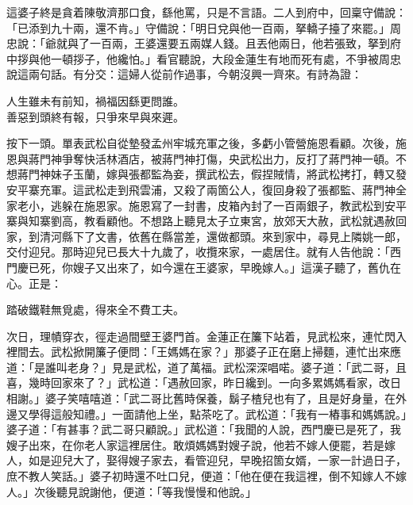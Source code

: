 這婆子終是貪着陳敬濟那口食，繇他罵，只是不言語。{}二人到府中，回稟守備說：「已添到九十兩，還不肯。」守備說：「明日兌與他一百兩，拏轎子擡了來罷。」周忠說：「爺就與了一百兩，王婆還要五兩媒人錢。且丟他兩日，他若張致，拏到府中拶與他一頓拶子，他纔怕。」看官聽說，大段金蓮生有地而死有處，不爭被周忠說這兩句話。有分交：這婦人從前作過事，今朝沒興一齊來。有詩為證：

\begin{myquote}
人生雖未有前知，禍福因繇更問誰。\\善惡到頭終有報，只爭來早與來遲。
\end{myquote}

按下一頭。單表武松自從墊發孟州牢城充軍之後，多虧小管營施恩看顧。次後，施恩與蔣門神爭奪快活林酒店，被蔣門神打傷，央武松出力，反打了蔣門神一頓。不想蔣門神妹子玉蘭，嫁與張都監為妾，撰武松去，假捏賊情，將武松拷打，轉又發安平寨充軍。這武松走到飛雲浦，又殺了兩箇公人，復回身殺了張都監、蔣門神全家老小，逃躲在施恩家。施恩寫了一封書，皮箱內封了一百兩銀子，教武松到安平寨與知寨劉高，教看顧他。不想路上聽見太子立東宮，放郊天大赦，武松就遇赦回家，到清河縣下了文書，依舊在縣當差，還做都頭。來到家中，尋見上隣姚一郎，交付迎兒。那時迎兒已長大十九歲了，收攬來家，一處居住。就有人告他說：「西門慶已死，你嫂子又出來了，如今還在王婆家，早晚嫁人。」這漢子聽了，舊仇在心。正是：

\begin{myquote}
踏破鐵鞋無覓處，得來全不費工夫。
\end{myquote}

次日，理幘穿衣，徑走過間壁王婆門首。金蓮正在簾下站着，見武松來，連忙閃入裡間去。武松掀開簾子便問：「王媽媽在家？」那婆子正在磨上掃麵，連忙出來應道：「是誰叫老身？」見是武松，道了萬福。武松深深唱喏。婆子道：「武二哥，且喜，幾時回家來了？」武松道：「遇赦回家，昨日纔到。一向多累媽媽看家，改日相謝。」婆子笑嘻嘻道：「武二哥比舊時保養，鬍子楂兒也有了，且是好身量，在外邊又學得這般知禮。」{}一面請他上坐，點茶吃了。武松道：「我有一樁事和媽媽說。」婆子道：「有甚事？武二哥只顧說。」武松道：「我聞的人說，西門慶已是死了，我嫂子出來，在你老人家這裡居住。敢煩媽媽對嫂子說，他若不嫁人便罷，若是嫁人，如是迎兒大了，娶得嫂子家去，看管迎兒，早晚招箇女婿，一家一計過日子，庶不教人笑話。」婆子初時還不吐口兒，便道：「他在便在我這裡，倒不知嫁人不嫁人。」次後聽見說謝他，便道：「等我慢慢和他說。」{}

